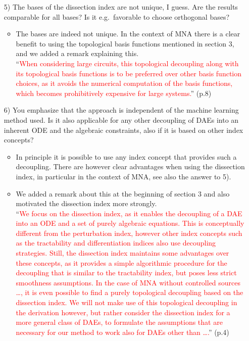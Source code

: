 \documentclass[a4paper, 10pt,
    ]{article}
\begin{document}
\begin{itemize}
        \item[5)] \textcolor{TUDa-0c}{The bases of the dissection index are not unique, I guess. Are the results comparable for all bases? Is it e.g.~favorable to choose orthogonal bases?}
        \begin{itemize}
            \item The bases are indeed not unique. In the context of MNA there is a clear benefit to using the topological basis functions mentioned in section 3, and we added a remark explaining this.\\
            ``\textcolor{red}{When considering large circuits, this topological decoupling along with its topological basis functions is to be preferred over other basis function choices, as it avoids the numerical computation of the basis functions, which becomes prohibitively expensive for large systems.}'' (p.8)
        \end{itemize}

        \item[6)] \textcolor{TUDa-0c}{You emphasize that the approach is independent of the machine learning method used. Is it also applicable for any other decoupling of DAEs into an inherent ODE and the algebraic constraints, also if it is based on other index concepts?}
        \begin{itemize}
            \item In principle it is possible to use any index concept that provides such a decoupling. There are however clear advantages when using the dissection index, in particular in the context of MNA, see also the answer to 5).
            \item We added a remark about this at the beginning of section 3 and also motivated the dissection index more strongly.\\
            ``\textcolor{red}{We focus on the dissection index, as it enables the decoupling of a DAE into an ODE and a set of purely algebraic equations. This is conceptually different from the perturbation index, however other index concepts such as the tractability and differentiation indices also use decoupling strategies. Still, the dissection index maintains some advantages over these concepts, as it provides a simple algorithmic procedure for the decoupling that is similar to the tractability index, but poses less strict smoothness assumptions. In the case of MNA without controlled sources \dots, it is even possible to find a purely topological decoupling based on the dissection index. We will not make use of this topological decoupling in the derivation however, but rather consider the dissection index for a more general class of DAEs, to formulate the assumptions that are necessary for our method to work also for DAEs other than \dots.}'' (p.4)
        \end{itemize}
    \end{itemize}
\end{document}
